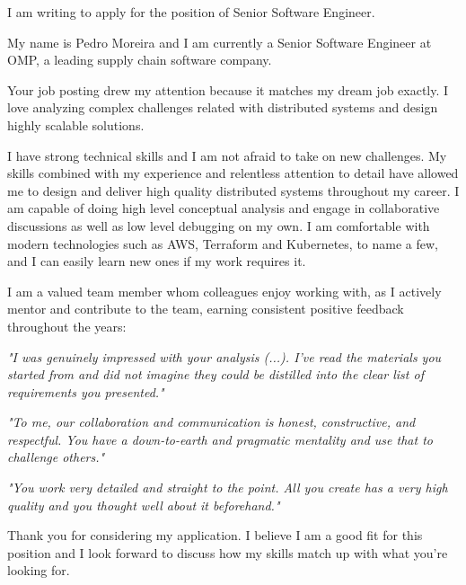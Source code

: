 I am writing to apply for the position of Senior Software Engineer.

My name is Pedro Moreira and I am currently a Senior Software Engineer at OMP, a leading supply chain software company.

Your job posting drew my attention because it matches my dream job exactly. I love analyzing complex challenges related with distributed systems and design highly scalable solutions.

I have strong technical skills and I am not afraid to take on new challenges. My skills combined with my experience and relentless attention to detail have allowed me to design and deliver high quality distributed systems throughout my career. I am capable of doing high level conceptual analysis and engage in collaborative discussions as well as low level debugging on my own. I am comfortable with modern technologies such as AWS, Terraform and Kubernetes, to name a few, and I can easily learn new ones if my work requires it.

I am a valued team member whom colleagues enjoy working with, as I actively mentor and contribute to the team, earning consistent positive feedback throughout the years:

\emph{"I was genuinely impressed with your analysis (...). I've read the materials you started from and did not imagine they could be distilled into the clear list of requirements you presented."}

\emph{"To me, our collaboration and communication is honest, constructive, and respectful. You have a down-to-earth and pragmatic mentality and use that to challenge others."}

\emph{"You work very detailed and straight to the point. All you create has a very high quality and you thought well about it beforehand."}

Thank you for considering my application. I believe I am a good fit for this position and I look forward to discuss how my skills match up with what you're looking for.
